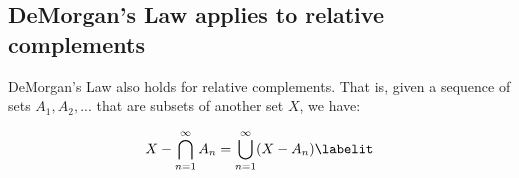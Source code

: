 \documentclass{article} %
\begin{document}
\subsection{DeMorgan's Law applies to relative complements} 

\begin{remark}
DeMorgan's Law also holds for relative complements.  That is, given a sequence of sets $A_1, A_2, ...$ that are subsets of another set $X$, we have:

\begin{align*}
X - \bigcap_{n=1}^\infty A_n = \bigcup_{n=1}^\infty (X - A_n)
\labelit \label{eqn:demorgan_for_relative_complements}	
\end{align*}

	
\end{remark}
\end{document}
